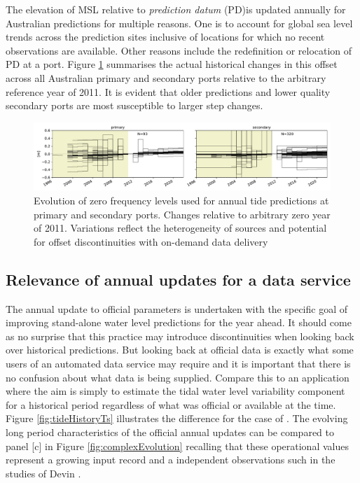 The elevation of MSL relative to \textit{prediction datum} (PD)is updated annually for Australian predictions for multiple reasons.   One is to account for global sea level trends across the prediction sites inclusive of locations for which no recent observations are available.   Other reasons include the redefinition or relocation of PD at a port.  Figure \ref{fig:z0Evolution} summarises the actual historical 
changes in this offset across all Australian primary and secondary ports relative to the arbitrary reference year of 2011.   It is evident that older predictions and lower quality secondary ports are most susceptible to larger step changes.

\begin{figure}[H]\centering
    \includegraphics[width=\figwidthFull]{figures/plots/Z0_evolution.pdf}
        \caption{Evolution of zero frequency levels used for annual tide predictions at primary and secondary ports. Changes relative to arbitrary zero year of 2011. Variations reflect the heterogeneity of sources and potential for offset discontinuities with on-demand data delivery}
    \label{fig:z0Evolution}
\end{figure}   

\subsection{Relevance of annual updates for a data service}
The annual update to official parameters is undertaken with the specific goal of improving stand-alone water level predictions for the year ahead.  It should come as no surprise that this practice may introduce discontinuities when looking back over historical predictions.
But looking back at official data is exactly what some users of an automated data service may require and it is important that there is no confusion about what data is being supplied.
Compare this to an application where the aim is simply to estimate the tidal water level variability component  for a historical period regardless of what was official or available at the time.
Figure \ref{fig:tideHistoryTs} illustrates the difference for the case of  \Dname{}.  The evolving long period characteristics of the official annual updates can be compared to panel [c] in Figure \ref{fig:complexEvolution} recalling that these operational values represent a growing input record and a independent observations such in the studies of Devin \cite{10.1002/2017jc013165}. 

